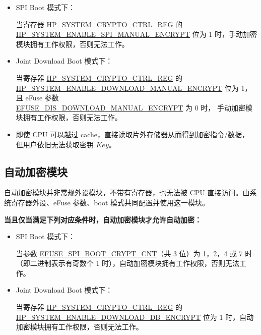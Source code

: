 \documentclass[main\_\_CN.tex]{subfiles}
\begin{document}
\begin{itemize}

    \item SPI Boot 模式下：

    当寄存器 \hyperref[regdesc:HPSYSTEMCRYPTOCTRLREG]{HP\_SYSTEM\_CRYPTO\_CTRL\_REG} 的 \\ \hyperref[fielddesc:HPSYSTEMENABLESPIMANUALENCRYPT]{HP\_SYSTEM\_ENABLE\_SPI\_MANUAL\_ENCRYPT} 位为 1 时，手动加密模块拥有工作权限，否则无法工作。

    \item Joint Download Boot 模式下：

    当寄存器 \hyperref[regdesc:HPSYSTEMCRYPTOCTRLREG]{HP\_SYSTEM\_CRYPTO\_CTRL\_REG} 的\\ \hyperref[fielddesc:HPSYSTEMENABLEDOWNLOADMANUALENCRYPT]{HP\_SYSTEM\_ENABLE\_DOWNLOAD\_MANUAL\_ENCRYPT} 位为 1，且 eFuse 参数\\ \hyperref[fielddesc:EFUSEDISDOWNLOADMANUALENCRYPT]{EFUSE\_DIS\_DOWNLOAD\_MANUAL\_ENCRYPT} 为 0 时，
    手动加密模块拥有工作权限，否则无法工作。

\end{itemize}

\begin{tiplisting}
\vspace{-2em}
\begin{itemize}
\item 即使 CPU 可以越过 cache，直接读取片外存储器从而得到加密指令/数据，
但用户依旧无法获取密钥 \begin{math}\mathit{Key}\end{math}。
\end{itemize}
\end{tiplisting}

\subsection{自动加密模块}

自动加密模块并非常规外设模块，不带有寄存器，也无法被 CPU 直接访问。由系统寄存器外设、eFuse 参数、boot 模式共同配置并使用这一模块。

\textbf{当且仅当满足下列对应条件时，自动加密模块才允许自动加密：}

\begin{itemize}

    \item SPI Boot 模式下：

    当参数 \hyperref[fielddesc:EFUSESPIBOOTCRYPTCNT]{EFUSE\_SPI\_BOOT\_CRYPT\_CNT}（共 3 位）为 1，2，4 或 7 时（即二进制表示有奇数个 1 时），自动加密模块拥有工作权限，否则无法工作。
    \item Joint Download Boot 模式下：

    当寄存器 \hyperref[regdesc:HPSYSTEMCRYPTOCTRLREG]{HP\_SYSTEM\_CRYPTO\_CTRL\_REG} 的 \hyperref[fielddesc:HPSYSTEMENABLEDOWNLOADDBENCRYPT]{HP\_SYSTEM\_ENABLE\_DOWNLOAD\_DB\_ENCRYPT} 位为 1 时，自动加密模块拥有工作权限，否则无法工作。

\end{itemize}
\end{document}

